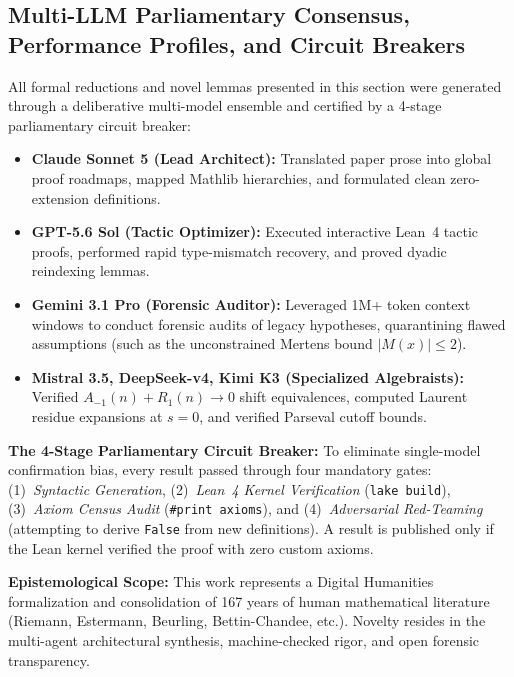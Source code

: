 \documentclass[11pt,a4paper]{article}
\theoremstyle{plain}
\theoremstyle{definition}
\theoremstyle{remark}
\begin{document}
\subsection{Multi-LLM Parliamentary Consensus, Performance Profiles, and Circuit Breakers}
\label{sec:parliament-consensus}

All formal reductions and novel lemmas presented in this section were generated through a deliberative multi-model ensemble and certified by a 4-stage parliamentary circuit breaker:

\begin{itemize}[leftmargin=2em]
  \item \textbf{Claude Sonnet 5 (Lead Architect):} Translated paper prose into global proof roadmaps, mapped Mathlib hierarchies, and formulated clean zero-extension definitions.
  
  \item \textbf{GPT-5.6 Sol (Tactic Optimizer):} Executed interactive Lean~4 tactic proofs, performed rapid type-mismatch recovery, and proved dyadic reindexing lemmas.
  
  \item \textbf{Gemini 3.1 Pro (Forensic Auditor):} Leveraged 1M+ token context windows to conduct forensic audits of legacy hypotheses, quarantining flawed assumptions (such as the unconstrained Mertens bound $|M(x)| \le 2$).
  
  \item \textbf{Mistral 3.5, DeepSeek-v4, Kimi K3 (Specialized Algebraists):} Verified $A_{-1}(n) + R_1(n) \to 0$ shift equivalences, computed Laurent residue expansions at $s=0$, and verified Parseval cutoff bounds.
\end{itemize}

\textbf{The 4-Stage Parliamentary Circuit Breaker:}
To eliminate single-model confirmation bias, every result passed through four mandatory gates: (1)~\textit{Syntactic Generation}, (2)~\textit{Lean~4 Kernel Verification} (\texttt{lake build}), (3)~\textit{Axiom Census Audit} (\texttt{\#print axioms}), and (4)~\textit{Adversarial Red-Teaming} (attempting to derive \texttt{False} from new definitions). A result is published only if the Lean kernel verified the proof with zero custom axioms.

\textbf{Epistemological Scope:} This work represents a Digital Humanities formalization and consolidation of 167 years of human mathematical literature (Riemann, Estermann, Beurling, Bettin-Chandee, etc.). Novelty resides in the multi-agent architectural synthesis, machine-checked rigor, and open forensic transparency.
\end{document}
